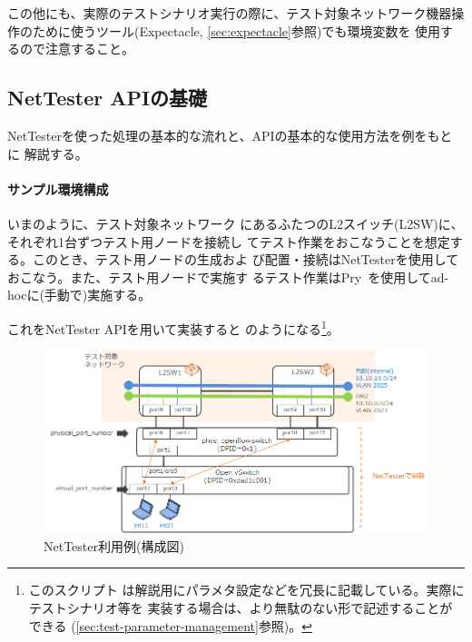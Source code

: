 この他にも、実際のテストシナリオ実行の際に、テスト対象ネットワーク機器操
作のために使うツール(Expectacle, \ref{sec:expectacle}参照)でも環境変数を
使用するので注意すること。

  \subsection{NetTester APIの基礎}
  \label{sec:nettester-api-basics}

NetTesterを使った処理の基本的な流れと、APIの基本的な使用方法を例をもとに
解説する。

\paragraph{サンプル環境構成}

いまのように、テスト対象ネットワーク
にあるふたつのL2スイッチ(L2SW)に、それぞれ1台ずつテスト用ノードを接続し
てテスト作業をおこなうことを想定する。このとき、テスト用ノードの生成およ
び配置・接続はNetTesterを使用しておこなう。また、テスト用ノードで実施す
るテスト作業はPry~\cite{pry}を使用してad-hocに(手動で)実施する。

これをNetTester APIを用いて実装すると
のようになる\footnote{このスクリプト
は解説用にパラメタ設定などを冗長に記載している。実際にテストシナリオ等を
実装する場合は、より無駄のない形で記述することができる
(\ref{sec:test-parameter-management}参照)。}。

\begin{figure}[h]
 \centering
 \includegraphics[scale=0.75]{img/nettester-basic-example.png}
 \caption{NetTester利用例(構成図)}
 \label{fig:nettester-basic-example}
\end{figure}

